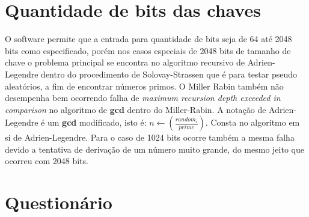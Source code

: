 \documentclass[conference]{IEEEtran}
\begin{document}
\section{Quantidade de bits das chaves}

O software permite que a entrada para quantidade de bits seja de 64 até 2048
bits como especificado, porém nos casos especiais de 2048 bits de tamanho de
chave o problema principal se encontra no algoritmo recursivo de Adrien-Legendre
dentro do procedimento de Solovay-Strassen que é para testar pseudo aleatórios,
a fim de encontrar números primos. O Miller Rabin também não desempenha bem
ocorrendo falha de \textit{maximum recursion depth exceeded in comparison} no
algoritmo de \textbf{gcd} dentro do Miller-Rabin. A notação de Adrien-Legendre é
um \textbf{gcd} modificado, isto é: $n \gets (\frac{random_i}{prime})$. Consta
no algoritmo em sí de Adrien-Legendre. Para o caso de 1024 bits ocorre também a
mesma falha devido a tentativa de derivação de um número muito grande, do mesmo
jeito que ocorreu com 2048 bits.

\section{Questionário}
\end{document}
